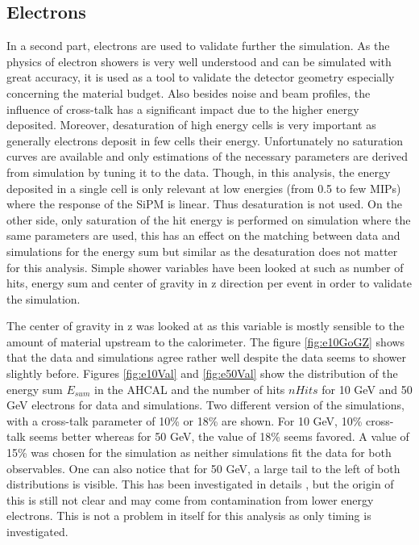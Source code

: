 \subsection{Electrons}

In a second part, electrons are used to validate further the simulation. As the physics of electron showers is very well understood and can be simulated with great accuracy, it is used as a tool to validate the detector geometry especially concerning the material budget. Also besides noise and beam profiles, the influence of cross-talk has a significant impact due to the higher energy deposited. Moreover, desaturation of high energy cells is very important as generally electrons deposit in few cells their energy. Unfortunately no saturation curves are available and only estimations of the necessary parameters are derived from simulation by tuning it to the data. Though, in this analysis, the energy deposited in a single cell is only relevant at low energies (from 0.5 to few MIPs) where the response of the SiPM is linear. Thus desaturation is not used. On the other side, only saturation of the hit energy is performed on simulation where the same parameters are used, this has an effect on the matching between data and simulations for the energy sum but similar as the desaturation does not matter for this analysis. Simple shower variables have been looked at such as number of hits, energy sum and center of gravity in z direction per event in order to validate the simulation.

The center of gravity in z was looked at as this variable is mostly sensible to the amount of material upstream to the calorimeter. The figure \ref{fig:e10GoGZ} shows that the data and simulations agree rather well despite the data seems to shower slightly before. Figures \ref{fig:e10Val} and \ref{fig:e50Val} show the distribution of the energy sum $E_{sum}$ in the AHCAL and the number of hits $nHits$ for 10 GeV and 50 GeV electrons for data and simulations. Two different version of the simulations, with a cross-talk parameter of 10\% or 18\% are shown. For 10 GeV, 10\% cross-talk seems better whereas for 50 GeV, the value of 18\% seems favored. A value of 15\% was chosen for the simulation as neither simulations fit the data for both observables. One can also notice that for 50 GeV, a large tail to the left of both distributions is visible. This has been investigated in details \cite{AmbraEnergy}, but the origin of this is still not clear and may come from contamination from lower energy electrons. This is not a problem in itself for this analysis as only timing is investigated.

